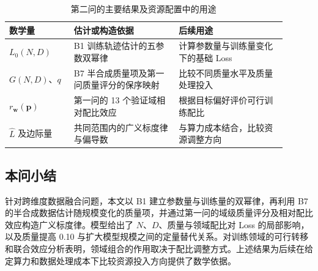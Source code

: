 \begin{table}[htbp]
 \centering\small
 \caption{第二问的主要结果及资源配置中的用途}
 \label{tab:q2-output}
 \begin{tabular}{p{0.21\linewidth}p{0.34\linewidth}p{0.35\linewidth}}
 \toprule
 数学量 & 估计或构造依据 & 后续用途\\
 \midrule
 $L_0(N,D)$ & B1 训练轨迹估计的五参数双幂律 & 计算参数量与训练量变化下的基础 Loss\\
 $G(N,D)$、$q$ & B7 半合成质量项及第一问质量评分的保序映射 & 比较不同质量水平及质量处理投入\\
 $r_{\boldsymbol w}(\boldsymbol p)$ & 第一问的 13 个验证域相对配比效应 & 根据目标偏好评价可行训练配比\\
 $\widehat L$ 及边际量 & 共同范围内的广义标度律与偏导数 & 与算力成本结合，比较资源调整方向\\
 \bottomrule
 \end{tabular}
\end{table}

\subsection{本问小结}

针对跨维度数据融合问题，本文以 B1 建立参数量与训练量的双幂律，再利用 B7 的半合成数据估计随规模变化的质量项，并通过第一问的域级质量评分及相对配比效应构造广义标度律。模型给出了 $N$、$D$、质量与领域配比对 Loss 的局部影响，以及质量提高 0.10 与扩大模型规模之间的定量替代关系。对训练领域的可行转移和联合效应分析表明，领域组合的作用取决于配比调整方式。上述结果为后续在给定算力和数据处理成本下比较资源投入方向提供了数学依据。
